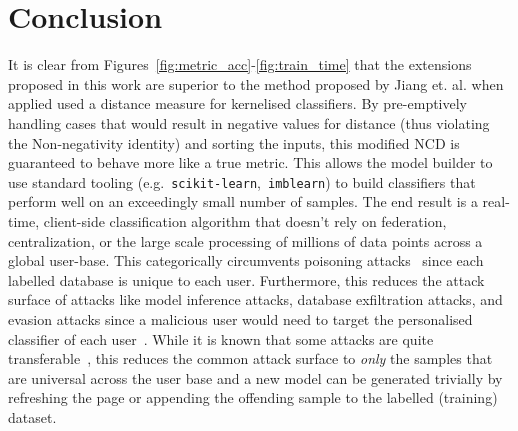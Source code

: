 \documentclass[conference]{IEEEtran}
\begin{document}
\section{Conclusion}
\label{conclusion}

It is clear from Figures~\ref{fig:metric_acc}-\ref{fig:train_time} that the extensions proposed in this work are superior to the method proposed by Jiang et. al. when applied used a distance measure for kernelised classifiers. 
By pre-emptively handling cases that would result in negative values for distance (thus violating the Non-negativity identity) and sorting the inputs, this modified NCD is guaranteed to behave more like a true metric. 
This allows the model builder to use standard tooling (e.g.~\texttt{scikit-learn},~\texttt{imblearn}) to build classifiers that perform well on an exceedingly small number of samples. The end result is a real-time, client-side classification algorithm that doesn't rely on federation, centralization, or the large scale processing of millions of data points across a global user-base. 
This categorically circumvents poisoning attacks~\cite{biggio_poisoning_2013} since each labelled database is unique to each user. 
Furthermore, this reduces the attack surface of attacks like model inference attacks, database exfiltration attacks, and evasion attacks since a malicious user would need to target the personalised classifier of each user~\cite{biggio_evasion_2013,deepfool,chakraborty_adversarial_2018}. 
While it is known that some attacks are quite transferable~\cite{wang2021enhancing}, this reduces the common attack surface to \textit{only} the samples that are universal across the user base and a new model can be generated trivially by refreshing the page or appending the offending sample to the labelled (training) dataset. 





\newpage

\end{document}
